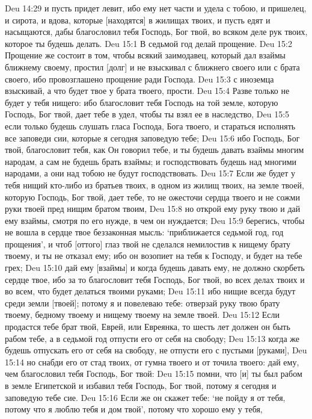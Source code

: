 Deu 14:29  и пусть придет левит, ибо ему нет части и удела с тобою, и пришелец, и сирота, и вдова, которые [находятся] в жилищах твоих, и пусть едят и насыщаются, дабы благословил тебя Господь, Бог твой, во всяком деле рук твоих, которое ты будешь делать.
Deu 15:1  В седьмой год делай прощение.
Deu 15:2  Прощение же состоит в том, чтобы всякий заимодавец, который дал взаймы ближнему своему, простил [долг] и не взыскивал с ближнего своего или с брата своего, ибо провозглашено прощение ради Господа.
Deu 15:3  с иноземца взыскивай, а что будет твое у брата твоего, прости.
Deu 15:4  Разве только не будет у тебя нищего: ибо благословит тебя Господь на той земле, которую Господь, Бог твой, дает тебе в удел, чтобы ты взял ее в наследство,
Deu 15:5  если только будешь слушать гласа Господа, Бога твоего, и стараться исполнять все заповеди сии, которые я сегодня заповедую тебе;
Deu 15:6  ибо Господь, Бог твой, благословит тебя, как Он говорил тебе, и ты будешь давать взаймы многим народам, а сам не будешь брать взаймы; и господствовать будешь над многими народами, а они над тобою не будут господствовать.
Deu 15:7  Если же будет у тебя нищий кто-либо из братьев твоих, в одном из жилищ твоих, на земле твоей, которую Господь, Бог твой, дает тебе, то не ожесточи сердца твоего и не сожми руки твоей пред нищим братом твоим,
Deu 15:8  но открой ему руку твою и дай ему взаймы, смотря по его нужде, в чем он нуждается;
Deu 15:9  берегись, чтобы не вошла в сердце твое беззаконная мысль: `приближается седьмой год, год прощения', и чтоб [оттого] глаз твой не сделался немилостив к нищему брату твоему, и ты не отказал ему; ибо он возопиет на тебя к Господу, и будет на тебе грех;
Deu 15:10  дай ему [взаймы] и когда будешь давать ему, не должно скорбеть сердце твое, ибо за то благословит тебя Господь, Бог твой, во всех делах твоих и во всем, что будет делаться твоими руками;
Deu 15:11  ибо нищие всегда будут среди земли [твоей]; потому я и повелеваю тебе: отверзай руку твою брату твоему, бедному твоему и нищему твоему на земле твоей.
Deu 15:12  Если продастся тебе брат твой, Еврей, или Евреянка, то шесть лет должен он быть рабом тебе, а в седьмой год отпусти его от себя на свободу;
Deu 15:13  когда же будешь отпускать его от себя на свободу, не отпусти его с пустыми [руками],
Deu 15:14  но снабди его от стад твоих, от гумна твоего и от точила твоего: дай ему, чем благословил тебя Господь, Бог твой:
Deu 15:15  помни, что [и] ты был рабом в земле Египетской и избавил тебя Господь, Бог твой, потому я сегодня и заповедую тебе сие.
Deu 15:16  Если же он скажет тебе: `не пойду я от тебя, потому что я люблю тебя и дом твой', потому что хорошо ему у тебя,

